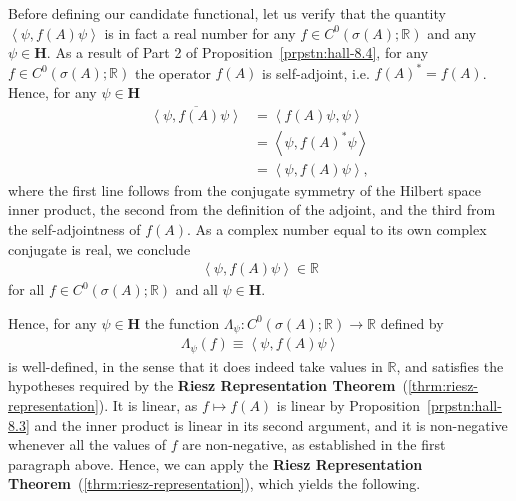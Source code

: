 Before defining our candidate functional, let us verify that the quantity $\left< \psi, f(A) \psi \right>$ is in fact a real number for any $f \in C^0(\sigma(A) ; \mathbb{R})$ and any $\psi \in \mathbf{H}$. As a result of Part 2 of Proposition~\ref{prpstn:hall-8.4}, for any $f \in C^0(\sigma(A) ; \mathbb{R})$ the operator $f(A)$ is self-adjoint, i.e. $f(A)^* = f(A)$. Hence, for any $\psi \in \mathbf{H}$
\begin{align}
    \overline{\left< \psi, f(A) \psi \right>} &= \left< f(A) \psi, \psi \right> \\
                                              &= \left< \psi, f(A)^* \psi \right> \\
                                              &= \left< \psi, f(A) \psi \right>,
\end{align}
where the first line follows from the conjugate symmetry of the Hilbert space inner product, the second from the definition of the adjoint, and the third from the self-adjointness of $f(A)$. As a complex number equal to its own complex conjugate is real, we conclude
\begin{align}
    \left< \psi, f(A) \psi \right> \in \mathbb{R}
\end{align}
for all $f \in C^0(\sigma(A) ; \mathbb{R})$ and all $\psi \in \mathbf{H}$.

Hence, for any $\psi \in \mathbf{H}$ the function $\Lambda_\psi : C^0(\sigma(A) ; \mathbb{R}) \rightarrow \mathbb{R}$ defined by
\begin{align}
    \Lambda_\psi(f) \equiv \left< \psi, f(A) \psi \right>
\end{align}
is well-defined, in the sense that it does indeed take values in $\mathbb{R}$, and satisfies the hypotheses required by the \textbf{Riesz Representation Theorem}~(\ref{thrm:riesz-representation}). It is linear, as $f \mapsto f(A)$ is linear by Proposition~\ref{prpstn:hall-8.3} and the inner product is linear in its second argument, and it is non-negative whenever all the values of $f$ are non-negative, as established in the first paragraph above. Hence, we can apply the \textbf{Riesz Representation Theorem}~(\ref{thrm:riesz-representation}), which yields the following.

